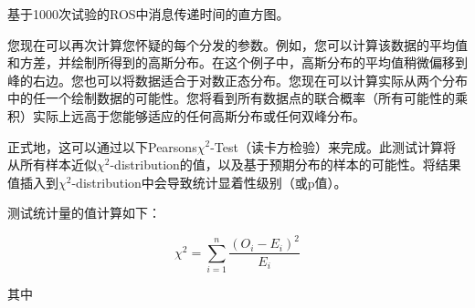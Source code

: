 \begin{framed}

基于1000次试验的ROS中消息传递时间的直方图。
\end{framed}




您现在可以再次计算您怀疑的每个分发的参数。例如，您可以计算该数据的平均值和方差，并绘制所得到的高斯分布。在这个例子中，高斯分布的平均值稍微偏移到峰的右边。您也可以将数据适合于对数正态分布。您现在可以计算实际从两个分布中的任一个绘制数据的可能性。您将看到所有数据点的联合概率（所有可能性的乘积）实际上远高于您能够适应的任何高斯分布或任何双峰分布。

正式地，这可以通过以下Pearsons$\chi^2$-Test（读卡方检验）来完成。此测试计算将从所有样本近似$\chi^2$-distribution的值，以及基于预期分布的样本的可能性。将结果值插入到$\chi^2$-distribution中会导致统计显着性级别（或p值）。

测试统计量的值计算如下：

\begin{equation}
\chi^2 = \sum_{i=1}^{n} \frac{(O_i - E_i)^2}{E_i}
\end{equation}

其中

